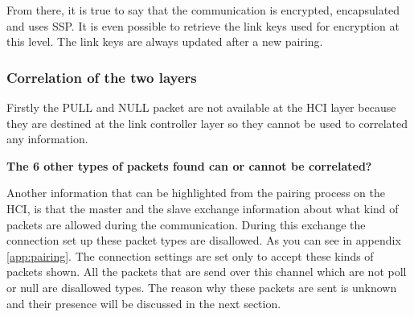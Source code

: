 From there, it is true to say that the communication is encrypted, encapsulated and uses SSP. It is even possible to retrieve the link keys used for encryption at this level. The link keys are always updated after a new pairing. 

\subsubsection{Correlation of the two layers}

Firstly the PULL and NULL packet are not available at the HCI layer because they are destined at the link controller layer so they cannot be used to correlated any information. 

\textbf{The 6 other types of packets found can or cannot be correlated?}

Another information that can be highlighted from the pairing process on the HCI, is that the master and the slave exchange information about what kind of packets are allowed during the communication. During this exchange the connection set up these packet types are disallowed. As you can see in appendix \ref{app:pairing}. The connection settings are set only to accept these kinds of packets shown. All the packets that are send over this channel which are not poll or null are disallowed types. The reason why these packets are sent is unknown and their presence will be discussed in the next section.  \pend


